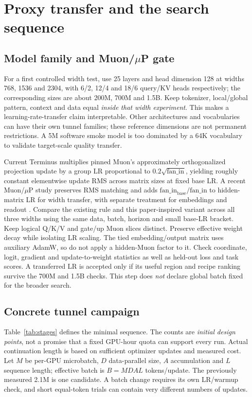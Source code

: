 \documentclass[10pt,a4paper]{article}
\begin{document}
\section{Proxy transfer and the search sequence}
\label{sec:transfer}

\subsection{Model family and \texorpdfstring{Muon/$\mu$P}{Muon/muP} gate}

For a first controlled width test, use 25 layers and head dimension 128 at widths 768, 1536 and 2304, with 6/2, 12/4 and 18/6 query/KV heads respectively; the corresponding sizes are about 200M, 700M and 1.5B. Keep tokenizer, local/global pattern, context and data equal \emph{inside that width experiment}. This makes a learning-rate-transfer claim interpretable. Other architectures and vocabularies can have their own tunnel families; these reference dimensions are not permanent restrictions. A 5M software smoke model is too dominated by a 64K vocabulary to validate target-scale quality transfer.

Current Terminus multiplies pinned Muon's approximately orthogonalized projection update by a group LR proportional to $0.2\sqrt{\mathrm{fan\_in}}$, yielding roughly constant elementwise update RMS across matrix sizes at fixed base LR. A recent Muon/$\mu$P study preserves RMS matching and adds $\mathrm{fan\_in}_{\mathrm{base}}/\mathrm{fan\_in}$ to hidden-matrix LR for width transfer, with separate treatment for embeddings and readout \cite{muonmup,moonlight}. Compare the existing rule and this paper-inspired variant across all three widths using the same data, batch, horizon and small base-LR bracket. Keep logical Q/K/V and gate/up Muon slices distinct. Preserve effective weight decay while isolating LR scaling. The tied embedding/output matrix uses auxiliary AdamW, so do not apply a hidden-Muon factor to it. Check coordinate, logit, gradient and update-to-weight statistics as well as held-out loss and task scores. A transferred LR is accepted only if its useful region and recipe ranking survive the 700M and 1.5B checks. This step does \emph{not} declare global batch fixed for the broader search.

\subsection{Concrete tunnel campaign}

Table~\ref{tab:stages} defines the minimal sequence. The counts are \emph{initial design points}, not a promise that a fixed GPU-hour quota can support every run. Actual continuation length is based on sufficient optimizer updates and measured cost. Let $M$ be per-GPU microbatch, $D$ data-parallel size, $A$ accumulation and $L$ sequence length; effective batch is $B=MDAL$ tokens/update. The previously measured 2.1M is one candidate. A batch change requires its own LR/warmup check, and short equal-token trials can contain very different numbers of updates.
\end{document}

